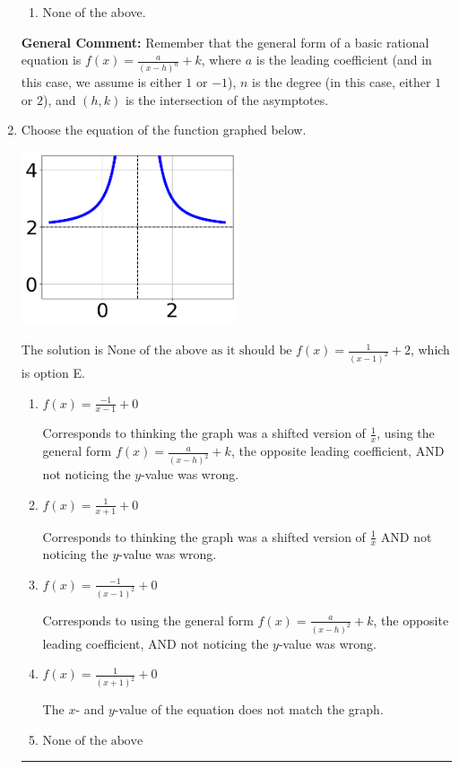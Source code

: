 \documentclass{extbook}[14pt]
\newcommand{\litem}[1]{\item #1

\rule{\textwidth}{0.4pt}}
\begin{document}
\begin{enumerate}
{\begin{enumerate}[label=\Alph*.]
\begin{multicols}{2}
\end{multicols}\item None of the above.\end{enumerate}
\textbf{General Comment:} Remember that the general form of a basic rational equation is $ f(x) = \frac{a}{(x-h)^n} + k$, where $a$ is the leading coefficient (and in this case, we assume is either $1$ or $-1$), $n$ is the degree (in this case, either $1$ or $2$), and $(h, k)$ is the intersection of the asymptotes.
}
\litem{
Choose the equation of the function graphed below.

\begin{center}
    \includegraphics[width=0.5\textwidth]{../Figures/rationalGraphToEquationC.png}
\end{center}


The solution is \( \text{None of the above as it should be } f(x) = \frac{1}{(x - 1)^2} + 2 \), which is option E.\begin{enumerate}[label=\Alph*.]
\item \( f(x) = \frac{-1}{x - 1} + 0 \)

Corresponds to thinking the graph was a shifted version of $\frac{1}{x}$, using the general form $f(x) = \frac{a}{(x-h)^2}+k$, the opposite leading coefficient, AND not noticing the $y$-value was wrong.
\item \( f(x) = \frac{1}{x + 1} + 0 \)

Corresponds to thinking the graph was a shifted version of $\frac{1}{x}$ AND not noticing the $y$-value was wrong.
\item \( f(x) = \frac{-1}{(x - 1)^2} + 0 \)

Corresponds to using the general form $f(x) = \frac{a}{(x-h)^2}+k$, the opposite leading coefficient, AND not noticing the $y$-value was wrong.
\item \( f(x) = \frac{1}{(x + 1)^2} + 0 \)

The $x$- and $y$-value of the equation does not match the graph.
\item \( \text{None of the above} \)


\end{enumerate}}
\end{enumerate}
\end{document}
